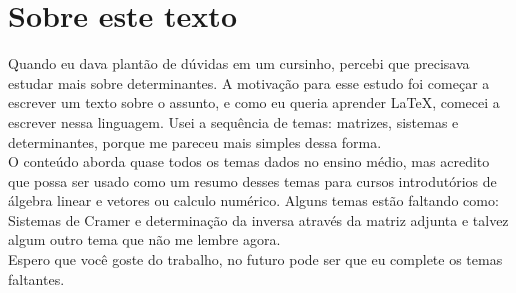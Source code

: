 \documentclass[10pt, a4paper, onecolumn, final]{article}
\begin{document}
\section*{Sobre este texto}
Quando eu dava plantão de dúvidas em um cursinho, percebi que precisava estudar mais sobre determinantes. A motivação para esse estudo foi começar a escrever um texto sobre o assunto, e como eu queria aprender \LaTeX, comecei a escrever nessa linguagem. Usei a sequência de temas: matrizes, sistemas e determinantes, porque me pareceu mais simples dessa forma.\\
O conteúdo aborda quase todos os temas dados no ensino médio, mas acredito que possa ser usado como um resumo desses temas para cursos introdutórios de álgebra linear e vetores ou calculo numérico. Alguns temas estão faltando como: Sistemas de Cramer e determinação da inversa através da matriz adjunta e talvez algum outro tema que não me lembre agora.\\
Espero que você goste do trabalho, no futuro pode ser que eu complete os temas faltantes.
\newpage
\hangindent=0.0cm





\end{document}

